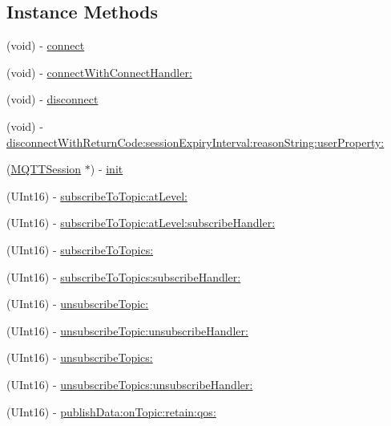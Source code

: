 \subsection*{Instance Methods}
\begin{DoxyCompactItemize}
\item 
(void) -\/ \hyperlink{interface_m_q_t_t_session_ad443eb80793d71150a825513303405b5}{connect}
\item 
(void) -\/ \hyperlink{interface_m_q_t_t_session_af2fb37adbbf9eeb28cea7dab43297fd7}{connect\+With\+Connect\+Handler\+:}
\item 
(void) -\/ \hyperlink{interface_m_q_t_t_session_aef2d0980b561184800908e95dd3a9fc7}{disconnect}
\item 
(void) -\/ \hyperlink{interface_m_q_t_t_session_a693cd5762ad92a97971ba95b7e0235c3}{disconnect\+With\+Return\+Code\+:session\+Expiry\+Interval\+:reason\+String\+:user\+Property\+:}
\item 
(\hyperlink{interface_m_q_t_t_session}{M\+Q\+T\+T\+Session} $\ast$) -\/ \hyperlink{interface_m_q_t_t_session_aee55d52a9b6395f1a0d73b672900629c}{init}
\item 
(U\+Int16) -\/ \hyperlink{interface_m_q_t_t_session_aafb7270fc99918effc0a39064ee5f91e}{subscribe\+To\+Topic\+:at\+Level\+:}
\item 
(U\+Int16) -\/ \hyperlink{interface_m_q_t_t_session_adaefcb4ee5a31355846653eddffc494f}{subscribe\+To\+Topic\+:at\+Level\+:subscribe\+Handler\+:}
\item 
(U\+Int16) -\/ \hyperlink{interface_m_q_t_t_session_ad90eef680e3adc29a75556e4131bdbf6}{subscribe\+To\+Topics\+:}
\item 
(U\+Int16) -\/ \hyperlink{interface_m_q_t_t_session_a26abfdc1d64491bff4825727042e3342}{subscribe\+To\+Topics\+:subscribe\+Handler\+:}
\item 
(U\+Int16) -\/ \hyperlink{interface_m_q_t_t_session_a0b9b75a7232586150cbc348b1262faaf}{unsubscribe\+Topic\+:}
\item 
(U\+Int16) -\/ \hyperlink{interface_m_q_t_t_session_a49e7dde1369377da92ae0f7fc2eb187f}{unsubscribe\+Topic\+:unsubscribe\+Handler\+:}
\item 
(U\+Int16) -\/ \hyperlink{interface_m_q_t_t_session_ac93b09cbe98c4b8754180e344ef7e908}{unsubscribe\+Topics\+:}
\item 
(U\+Int16) -\/ \hyperlink{interface_m_q_t_t_session_a1d566cac765cdcdb2563ffa45ef53bbe}{unsubscribe\+Topics\+:unsubscribe\+Handler\+:}
\item 
(U\+Int16) -\/ \hyperlink{interface_m_q_t_t_session_a7551772841b6bc2f46c0848d323fd0f7}{publish\+Data\+:on\+Topic\+:retain\+:qos\+:}

\end{DoxyCompactItemize}
